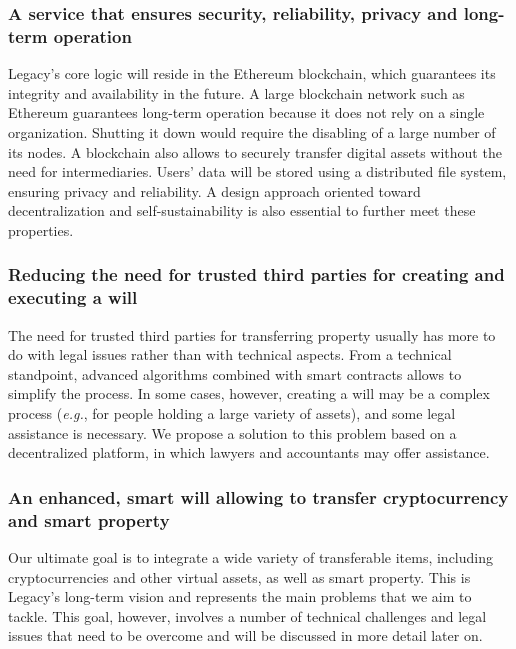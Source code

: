 \subsubsection*{A service that ensures security, reliability, privacy and long-term operation} %
\label{ssub:a_service_that_ensures_security_reliability_privacy_and_long_term_operation}
Legacy's core logic will reside in the Ethereum blockchain, which guarantees its integrity and availability in the future. 
A large blockchain network such as Ethereum guarantees long-term operation because it does not rely on a single organization. Shutting it down would require the disabling of a large number of its nodes.
A blockchain also allows to securely transfer digital assets without the need for intermediaries.
Users' data will be stored using a distributed file system, ensuring privacy and reliability.
A design approach oriented toward decentralization and self-sustainability is also essential to further meet these properties.


\subsubsection*{Reducing the need for trusted third parties for creating and executing a will} %
\label{ssub:reducing_the_need_for_trusted_third_parties_for_creating_and_executing_a_will}
The need for trusted third parties for transferring property usually has more to do with legal issues rather than with technical aspects. From a technical standpoint, advanced algorithms combined with smart contracts allows to simplify the process. In some cases, however, creating a will may be a complex process (\textit{e.g.}, for people holding a large variety of assets), and some legal assistance is necessary. We propose a solution to this problem based on a decentralized platform, in which lawyers and accountants may offer assistance.

\subsubsection*{An enhanced, smart will allowing to transfer cryptocurrency and smart property} %
\label{ssub:_an_enhanced_smart_will_allowing_to_transfer_cryptocurrency_and_smart_property_}
Our ultimate goal is to integrate a wide variety of transferable items, including cryptocurrencies and other virtual assets, as well as smart property. 
This is Legacy's long-term vision and represents the main problems that we aim to tackle. 
 This goal, however, involves a number of technical challenges and legal issues that need to be overcome and will be discussed in more detail later on.

